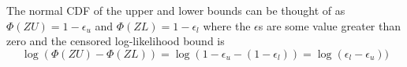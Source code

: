 \documentclass[11pt]{article}\usepackage[]{graphicx}\usepackage[]{color}
\begin{document}
\begin{appendices}
The normal CDF of the upper and lower bounds can be thought of as $\Phi(ZU)=1-\epsilon_u$ and $\Phi(ZL)=1-\epsilon_l$ where the $\epsilon$s are some value greater than zero and the censored log-likelihood bound is 
\begin{equation}
	\log(\Phi(ZU)-\Phi(ZL)) = \log(1-\epsilon_u-(1-\epsilon_l)) = \log(\epsilon_l-\epsilon_u))
\end{equation}

\end{appendices}


\printbibliography
\end{document}

